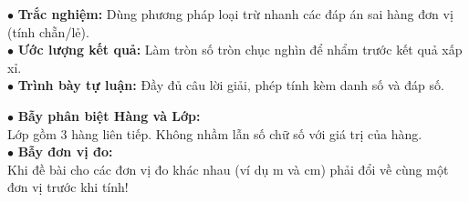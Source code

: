 \documentclass[14pt,a4paper,oneside]{extbook}
\begin{document}
\noindent
\begin{minipage}[t]{0.54\textwidth}
  \begin{tcolorbox}[
    enhanced,
    title={\footnotesize\bfseries\color{white}\faTrophy\ Chiến thuật giải nhanh đề kiểm tra},
    colback=green!3!white,
    colframe=green!60!black,
    arc=2.5mm, boxrule=0.8pt, top=1.8mm, bottom=1.8mm, left=2.2mm, right=2.2mm
  ]
    \footnotesize
    $\bullet$ \textbf{Trắc nghiệm:} Dùng phương pháp loại trừ nhanh các đáp án sai hàng đơn vị (tính chẵn/lẻ).\\
    $\bullet$ \textbf{Ước lượng kết quả:} Làm tròn số tròn chục nghìn để nhẩm trước kết quả xấp xỉ.\\
    $\bullet$ \textbf{Trình bày tự luận:} Đầy đủ câu lời giải, phép tính kèm danh số và đáp số.
  \end{tcolorbox}
\end{minipage}%
\hfill
\begin{minipage}[t]{0.44\textwidth}
  \begin{tcolorbox}[
    enhanced,
    title={\footnotesize\bfseries\color{white}\faExclamationTriangle\ Mẹo tránh bẫy trắc nghiệm},
    colback=red!2!white,
    colframe=red!70!black,
    arc=2.5mm, boxrule=0.8pt, top=1.8mm, bottom=1.8mm, left=2.2mm, right=2.2mm
  ]
    \footnotesize
    $\bullet$ \textbf{Bẫy phân biệt Hàng và Lớp:}\\
    Lớp gồm 3 hàng liên tiếp. Không nhầm lẫn số chữ số với giá trị của hàng.\\
    $\bullet$ \textbf{Bẫy đơn vị đo:}\\
    Khi đề bài cho các đơn vị đo khác nhau (ví dụ m và cm) phải đổi về cùng một đơn vị trước khi tính!
  \end{tcolorbox}
\end{minipage}
\end{document}
